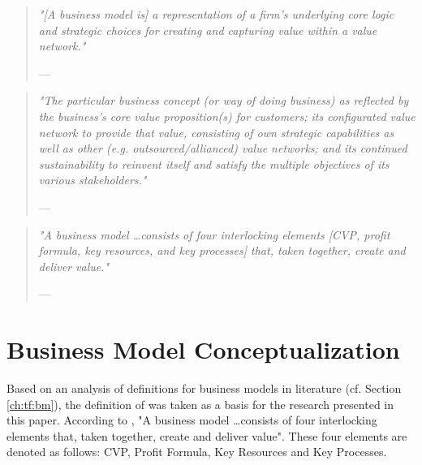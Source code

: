\begin{quote}{\slshape 
"[A business model is] a representation of a firm's underlying core logic and strategic choices for creating and capturing value within a value network."}
\vspace*{-5pt}
\begin{flushright}
	--- \citet[p. 202]{Shafer2005}
\end{flushright}
\end{quote}

\begin{quote}{\slshape 
"The particular business concept (or way of doing business) as reflected by the business's core value proposition(s) for customers; its configurated value network to provide that value, consisting of own strategic capabilities as well as other (e.g. outsourced/allianced) value networks; and its continued sustainability to reinvent itself and satisfy the multiple objectives of its various stakeholders."}
\vspace*{-5pt}
\begin{flushright}
	--- \citet[p. 40]{Voelpel2005}
\end{flushright}
\end{quote}

\begin{quote}{\slshape 
"A business model \ldots consists of four interlocking elements [\ac{CVP}, profit formula, key resources, and key processes] that, taken together, create and deliver value."}
\vspace*{-5pt}
\begin{flushright}
	--- \citet[p. 52]{Johnson2008}
\end{flushright}
\end{quote}



	
	
\section{Business Model Conceptualization}\label{ch:sota:bmc}

Based on an analysis of definitions for business models in literature (cf. Section \ref{ch:tf:bm}), the definition of \citet{Johnson2008} was taken as a basis for the research presented in this paper. According to \citet[p. 52]{Johnson2008}, "A business model \ldots consists of four interlocking elements that, taken together, create and deliver value". These four elements are denoted as follows: \ac{CVP}, Profit Formula, Key Resources and Key Processes. 

